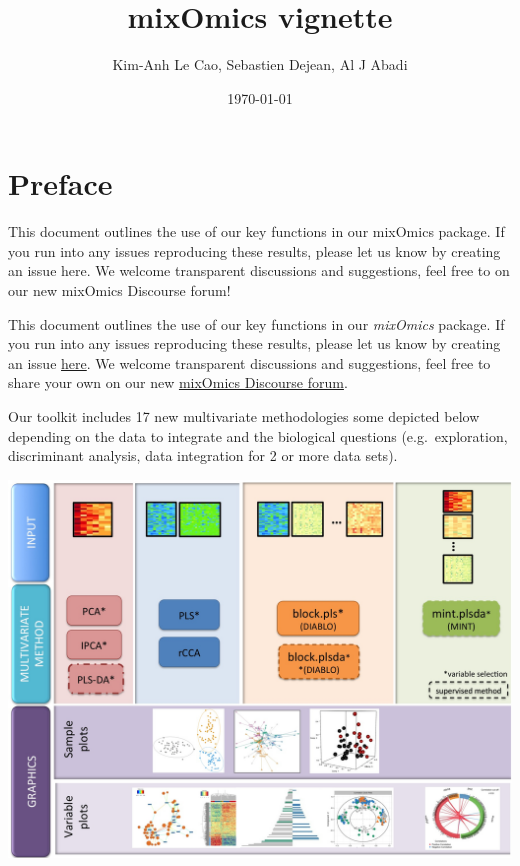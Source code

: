 \documentclass[]{book}
\title{mixOmics vignette}
\author{Kim-Anh Le Cao, Sebastien Dejean, Al J Abadi}
\date{\today}
\begin{document}
\maketitle

{
\setcounter{tocdepth}{1}
\tableofcontents
}
\hypertarget{preface}{%
\chapter*{Preface}\label{preface}}

This document outlines the use of our key functions in our mixOmics package. If you run into any issues reproducing these results, please let us know by creating an issue here. We welcome transparent discussions and suggestions, feel free to on our new mixOmics Discourse forum!

This document outlines the use of our key functions in our \emph{mixOmics} package. If you run into any issues reproducing these results, please let us know by creating an issue \href{https://github.com/mixOmicsTeam/Bookdown/issues}{here}. We welcome transparent discussions and suggestions, feel free to share your own on our new \href{https://mixomics-users.discourse.group/}{mixOmics Discourse forum}.

Our toolkit includes 17 new multivariate methodologies some depicted below depending on the data to integrate and the biological questions (e.g.~exploration, discriminant analysis, data integration for 2 or more data sets).

\begin{center}\includegraphics[width=1\linewidth,]{XtraFigs/framework-mixOmics-June2016} \end{center}
\end{document}
